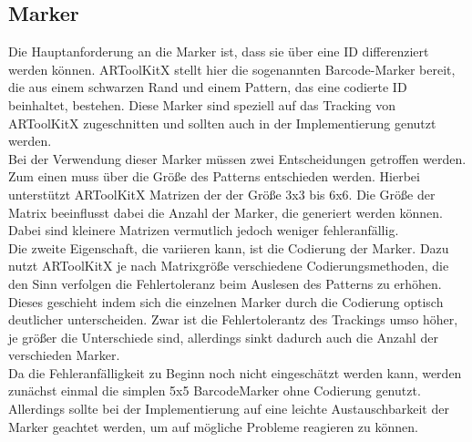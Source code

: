 \subsection{Marker}
Die Hauptanforderung an die Marker ist, dass sie über eine ID differenziert werden können. ARToolKitX stellt hier die sogenannten Barcode-Marker bereit, die aus einem schwarzen Rand und einem Pattern, das eine codierte ID beinhaltet, bestehen. Diese Marker sind speziell auf das Tracking von ARToolKitX zugeschnitten und sollten auch in der Implementierung genutzt werden. \\
Bei der Verwendung dieser Marker müssen zwei Entscheidungen getroffen werden.\\
Zum einen muss über die Größe des Patterns entschieden werden. Hierbei unterstützt ARToolKitX Matrizen der der Größe 3x3 bis 6x6. Die Größe der Matrix beeinflusst dabei die Anzahl der Marker, die generiert werden können. Dabei sind kleinere Matrizen vermutlich jedoch weniger fehleranfällig. \\
Die zweite Eigenschaft, die variieren kann, ist die Codierung der Marker. Dazu nutzt ARToolKitX je nach Matrixgröße verschiedene Codierungsmethoden, die den Sinn verfolgen die Fehlertoleranz beim Auslesen des Patterns zu erhöhen. Dieses geschieht indem sich die einzelnen Marker durch die Codierung optisch deutlicher unterscheiden. Zwar ist die Fehlertolerantz des Trackings umso höher, je größer die Unterschiede sind, allerdings sinkt dadurch auch die Anzahl der verschieden Marker.\\
Da die Fehleranfälligkeit zu Beginn noch nicht eingeschätzt werden kann, werden zunächst einmal die simplen 5x5 BarcodeMarker ohne Codierung genutzt. Allerdings sollte bei der Implementierung auf eine leichte Austauschbarkeit der Marker geachtet werden, um auf mögliche Probleme reagieren zu können.

